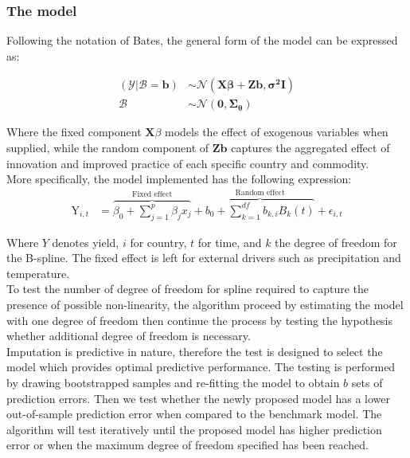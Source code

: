 \documentclass[nojss]{jss}\usepackage[]{graphicx}\usepackage[]{color}
\begin{document}
\subsubsection{The model}
Following the notation of Bates, the general form of the model can be
expressed as:

\begin{align}
  (\mathscr{Y}|\mathscr{B} = \mathbf{b}) &\sim
  \mathscr{N}(\mathbf{X}\boldsymbol{\beta} + \mathbf{Z}\mathbf{b},
  \boldsymbol{\sigma^2}\mathbf{I})\nonumber \\
  \mathscr{B} &\sim\mathscr{N}(\mathbf{0}, \boldsymbol{\Sigma_\theta})
\end{align}

Where the fixed component $\mathbf{X}\mathscr{\beta}$ models the
effect of exogenous variables when supplied, while the random
component of $\mathbf{Z}\mathbf{b}$ captures the aggregated effect of
innovation and improved practice of each specific country and
commodity. \\

More specifically, the model implemented has the following expression:
\begin{align}
  \label{eq:lmeImpute}
  \text{Y}_{i,t} &= \overbrace{\beta_0 + \sum_{j=1}^{p}\beta_j x_j}^{\text{Fixed effect}} +
  \overbrace{b_{0} + \sum_{k=1}^{df}b_{k, i}B_{k}(t)}^{\text{Random effect}} +
  \epsilon_{i,t}
\end{align}

Where $Y$ denotes yield, $i$ for country, $t$ for time, and $k$ the
degree of freedom for the B-spline. The fixed effect is left for
external drivers such as precipitation and temperature.\\


To test the number of degree of freedom for spline required to capture
the presence of possible non-linearity, the algorithm proceed by
estimating the model with one degree of freedom then continue the
process by testing the hypothesis whether additional degree of freedom
is necessary.\\

Imputation is predictive in nature, therefore the test is designed to
select the model which provides optimal predictive performance. The
testing is performed by drawing bootstrapped samples and re-fitting
the model to obtain $b$ sets of prediction errors. Then we test
whether the newly proposed model has a lower out-of-sample prediction
error when compared to the benchmark model. The algorithm will test
iteratively until the proposed model has higher prediction error or
when the maximum degree of freedom specified has been reached.\\
\end{document}
